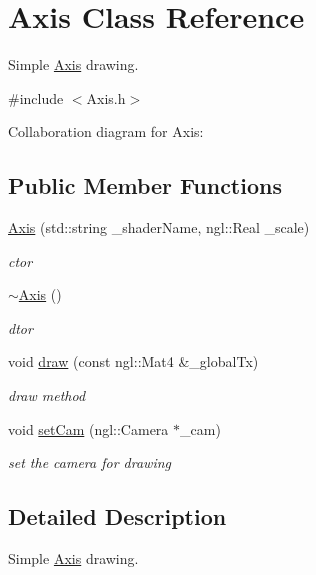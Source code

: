 \hypertarget{classAxis}{}\section{Axis Class Reference}
\label{classAxis}


Simple \hyperlink{classAxis}{Axis} drawing.  




{\ttfamily \#include $<$Axis.\+h$>$}



Collaboration diagram for Axis\+:
\subsection*{Public Member Functions}
\begin{DoxyCompactItemize}
\item 
\hyperlink{classAxis_af00b512700438f6c0d5c4f50d3f5e08f}{Axis} (std\+::string \+\_\+shader\+Name, ngl\+::\+Real \+\_\+scale)
\begin{DoxyCompactList}\small\item\em ctor \end{DoxyCompactList}\item 
\hyperlink{classAxis_a675ffe75a5e61a9e4f60bb79749d5e0c}{$\sim$\+Axis} ()
\begin{DoxyCompactList}\small\item\em dtor \end{DoxyCompactList}\item 
void \hyperlink{classAxis_a6a001a1f69c90c980822515e17fb1701}{draw} (const ngl\+::\+Mat4 \&\+\_\+global\+Tx)
\begin{DoxyCompactList}\small\item\em draw method \end{DoxyCompactList}\item 
void \hyperlink{classAxis_a2aa5d9e6cdf5a8453aa0e7a63d93efa1}{set\+Cam} (ngl\+::\+Camera $\ast$\+\_\+cam)
\begin{DoxyCompactList}\small\item\em set the camera for drawing \end{DoxyCompactList}\end{DoxyCompactItemize}


\subsection{Detailed Description}
Simple \hyperlink{classAxis}{Axis} drawing. 

